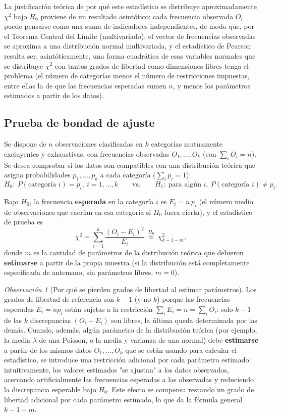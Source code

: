 \documentclass[11pt,a4paper]{article}
\theoremstyle{plain}
\theoremstyle{definition}
\theoremstyle{remark}
\newtheorem{observacion}[teorema]{Observación}
\begin{document}
La justificación teórica de por qué este estadístico se distribuye aproximadamente $\chi^2$ bajo $H_0$ proviene de un resultado asintótico: cada frecuencia observada $O_i$ puede pensarse como una suma de indicadores independientes, de modo que, por el Teorema Central del Límite (multivariado), el vector de frecuencias observadas se aproxima a una distribución normal multivariada, y el estadístico de Pearson resulta ser, asintóticamente, una forma cuadrática de esas variables normales que se distribuye $\chi^2$ con tantos grados de libertad como dimensiones libres tenga el problema (el número de categorías menos el número de restricciones impuestas, entre ellas la de que las frecuencias esperadas sumen $n$, y menos los parámetros estimados a partir de los datos).

\subsection{Prueba de bondad de ajuste}

Se dispone de $n$ observaciones clasificadas en $k$ categorías mutuamente excluyentes y exhaustivas, con frecuencias observadas $O_1,\dots,O_k$ (con $\sum_i O_i=n$). Se desea comprobar si los datos son compatibles con una distribución teórica que asigna probabilidades $p_1,\dots,p_k$ a cada categoría ($\sum_i p_i=1$):
\[
H_0:\ P(\text{categoría } i)=p_i,\ i=1,\dots,k \qquad \text{vs.}\qquad H_1:\ \text{para algún } i,\ P(\text{categoría } i)\neq p_i.
\]

Bajo $H_0$, la frecuencia \textbf{esperada} en la categoría $i$ es $E_i=n\,p_i$ (el número medio de observaciones que caerían en esa categoría si $H_0$ fuera cierta), y el estadístico de prueba es
\[
\chi^2=\sum_{i=1}^k\frac{(O_i-E_i)^2}{E_i}\ \overset{H_0}{\approx}\ \chi^2_{k-1-m},
\]
donde $m$ es la cantidad de parámetros de la distribución teórica que debieron \textbf{estimarse} a partir de la propia muestra (si la distribución está completamente especificada de antemano, sin parámetros libres, $m=0$).

\begin{observacion}[Por qué se pierden grados de libertad al estimar parámetros]
Los grados de libertad de referencia son $k-1$ (y no $k$) porque las frecuencias esperadas $E_i=np_i$ están sujetas a la restricción $\sum_i E_i=n=\sum_i O_i$: solo $k-1$ de las $k$ discrepancias $(O_i-E_i)$ son libres, la última queda determinada por las demás. Cuando, además, algún parámetro de la distribución teórica (por ejemplo, la media $\lambda$ de una Poisson, o la media y varianza de una normal) debe \textbf{estimarse} a partir de los mismos datos $O_1,\dots,O_k$ que se están usando para calcular el estadístico, se introduce una restricción adicional por cada parámetro estimado: intuitivamente, los valores estimados "se ajustan" a los datos observados, acercando artificialmente las frecuencias esperadas a las observadas y reduciendo la discrepancia esperable bajo $H_0$. Este efecto se compensa restando un grado de libertad adicional por cada parámetro estimado, lo que da la fórmula general $k-1-m$.
\end{observacion}
\end{document}
